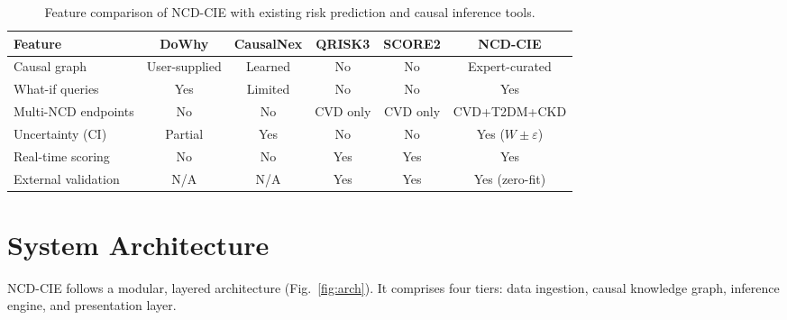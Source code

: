 \documentclass[runningheads]{llncs}
\begin{document}
\renewcommand{\arraystretch}{1.2}
\begin{table}[t]
\centering
\caption{Feature comparison of NCD-CIE with existing risk prediction
and causal inference tools.}\label{tab:toolcomp}
\small
\begin{tabular}{@{}lccccc@{}}
\toprule
\textbf{Feature} & \textbf{DoWhy} & \textbf{CausalNex} &
\textbf{QRISK3} & \textbf{SCORE2} & \textbf{NCD-CIE} \\
\midrule
Causal graph        & User-supplied & Learned & No  & No  & Expert-curated \\
What-if queries     & Yes & Limited & No  & No  & Yes \\
Multi-NCD endpoints & No  & No      & CVD only & CVD only & CVD+T2DM+CKD \\
Uncertainty (CI)    & Partial & Yes & No  & No  & Yes ($W\!\pm\!\varepsilon$) \\
Real-time scoring   & No  & No      & Yes & Yes & Yes \\
External validation & N/A & N/A     & Yes & Yes & Yes (zero-fit) \\
\bottomrule
\end{tabular}
\end{table}
\renewcommand{\arraystretch}{1.0}

\section{System Architecture}\label{sec:arch}

NCD-CIE follows a modular, layered architecture (Fig.~\ref{fig:arch}).
It comprises four tiers: data ingestion, causal knowledge graph,
inference engine, and presentation layer.
\end{document}
